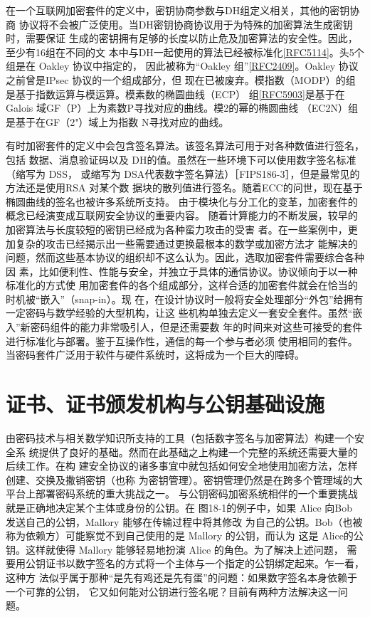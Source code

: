 在一个互联网加密套件的定义中，密钥协商参数与DH组定义相关，其他的密钥协商
协议将不会被广泛使用。当DH密钥协商协议用于为特殊的加密算法生成密钥时，需要保证
生成的密钥拥有足够的长度以防止危及加密算法的安全性。因此，至少有16组在不同的文
本中与DH一起使用的算法已经被标准化\href{https://www.rfc-editor.org/rfc/rfc5114}{[RFC5114]}。头5个组是在 Oakley 协议中指定的，
因此被称为“Oakley 组”\href{https://www.rfc-editor.org/rfc/rfc2409}{[RFC2409]}。Oakley 协议之前曾是IPsec 协议的一个组成部分，但
现在已被废弃。模指数（MODP）的组是基于指数运算与模运算。模素数的椭圆曲线（ECP）
组\href{https://www.rfc-editor.org/rfc/rfc5903}{[RFC5903]}是基于在Galois 域GF（P）上为素数P寻找对应的曲线。模2的幂的椭圆曲线
（EC2N）组是基于在GF（2"）域上为指数 N寻找对应的曲线。

有时加密套件的定义中会包含签名算法。该签名算法可用于对各种数值进行签名，包括
数据、消息验证码以及 DH的值。虽然在一些环境下可以使用数字签名标准（缩写为 DSS，
或缩写为 DSA代表数字签名算法）［FIPS186-3］，但是最常见的方法还是使用RSA 对某个数
据块的散列值进行签名。随着ECC的问世，现在基于椭圆曲线的签名也被许多系统所支持。
由于模块化与分工化的变革，加密套件的概念已经演变成互联网安全协议的重要内容。
随着计算能力的不断发展，较早的加密算法与长度较短的密钥已经成为各种蛮力攻击的受害
者。在一些案例中，更加复杂的攻击已经揭示出一些需要通过更换最根本的数学或加密方法才
能解决的问题，然而这些基本协议的组织却不这么认为。因此，选取加密套件需要综合各种因
素，比如便利性、性能与安全，并独立于具体的通信协议。协议倾向于以一种标准化的方式使
用加密套件的各个组成部分，这样合适的加密套件就会在恰当的时机被“嵌入”（snap-in）。现
在，在设计协议时一般将安全处理部分“外包”给拥有一定密码与数学经验的大型机构，让这
些机构单独去定义一套安全套件。虽然“嵌入”新密码组件的能力非常吸引人，但是还需要数
年的时间来对这些可接受的套件进行标准化与部署。鉴于互操作性，通信的每一个参与者必须
使用相同的套件。当密码套件广泛用于软件与硬件系统时，这将成为一个巨大的障碍。

\section{证书、证书颁发机构与公钥基础设施}

由密码技术与相关数学知识所支持的工具（包括数字签名与加密算法）构建一个安全系
统提供了良好的基础。然而在此基础之上构建一个完整的系统还需要大量的后续工作。在构
建安全协议的诸多事宜中就包括如何安全地使用加密方法，怎样创建、交换及撒销密钥（也称
为密钥管理）。密钥管理仍然是在跨多个管理域的大平台上部署密码系统的重大挑战之一。
与公钥密码加密系统相伴的一个重要挑战就是正确地决定某个主体或身份的公钥。在
图18-1的例子中，如果 Alice 向Bob 发送自己的公钥，Mallory 能够在传输过程中将其修改
为自己的公钥。Bob（也被称为依赖方）可能察觉不到自己使用的是 Mallory 的公钥，而认为
这是 Alice的公钥。这样就使得 Mallory 能够轻易地扮演 Alice 的角色。为了解决上述问题，
需要用公钥证书以数字签名的方式将一个主体与一个指定的公钥绑定起来。乍一看，这种方
法似乎属于那种“是先有鸡还是先有蛋”的问题：如果数字签名本身依赖于一个可靠的公钥，
它又如何能对公钥进行签名呢？目前有两种方法解决这一问题。

